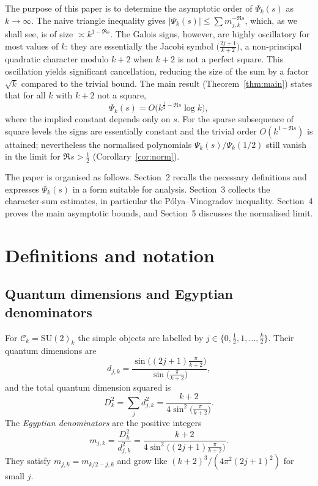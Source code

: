 \documentclass[11pt,a4paper]{article}
\theoremstyle{definition}
\theoremstyle{remark}
\begin{document}
The purpose of this paper is to determine the asymptotic order of $\Psi_k(s)$ as $k\to\infty$.
The naive triangle inequality gives $|\Psi_k(s)|\le \sum m_{j,k}^{-\Re s}$,
which, as we shall see, is of size $\asymp k^{1-\Re s}$.
The Galois signs, however, are highly oscillatory for most values of $k$:
they are essentially the Jacobi symbol $\bigl(\frac{2j+1}{k+2}\bigr)$,
a non‑principal quadratic character modulo $k+2$ when $k+2$ is not a perfect square.
This oscillation yields significant cancellation, reducing the size of the sum
by a factor $\sqrt{k}$ compared to the trivial bound.
The main result (Theorem~\ref{thm:main}) states that for all $k$ with $k+2$ not a square,
\[
\Psi_k(s)=O\bigl(k^{\frac12-\Re s}\log k\bigr),
\]
where the implied constant depends only on $s$.
For the sparse subsequence of square levels the signs are essentially constant and
the trivial order $O(k^{1-\Re s})$ is attained; nevertheless the normalised
polynomials $\Psi_k(s)/\Psi_k(1/2)$ still vanish in the limit for $\Re s>\frac12$
(Corollary~\ref{cor:norm}).

The paper is organised as follows.  Section~2 recalls the necessary definitions
and expresses $\Psi_k(s)$ in a form suitable for analysis.
Section~3 collects the character‑sum estimates, in particular the
P\'olya--Vinogradov inequality.  Section~4 proves the main asymptotic bounds,
and Section~5 discusses the normalised limit.

\section{Definitions and notation}

\subsection{Quantum dimensions and Egyptian denominators}
For $\mathcal{C}_k=\mathrm{SU}(2)_k$ the simple objects are labelled by
$j\in\{0,\tfrac12,1,\dots,\tfrac{k}{2}\}$.
Their quantum dimensions are
\begin{equation}\label{eq:qdim}
d_{j,k}= \frac{\sin\bigl((2j+1)\frac{\pi}{k+2}\bigr)}
                {\sin\bigl(\frac{\pi}{k+2}\bigr)},
\end{equation}
and the total quantum dimension squared is
\begin{equation}\label{eq:D2}
D_k^2=\sum_j d_{j,k}^2
     =\frac{k+2}{4\sin^2\!\bigl(\frac{\pi}{k+2}\bigr)}.
\end{equation}
The \emph{Egyptian denominators} are the positive integers
\begin{equation}\label{eq:m}
m_{j,k}= \frac{D_k^2}{d_{j,k}^2}
        =\frac{k+2}{4\sin^2\!\bigl((2j+1)\frac{\pi}{k+2}\bigr)}.
\end{equation}
They satisfy $m_{j,k}=m_{k/2-j,k}$ and grow like $(k+2)^3/(4\pi^2(2j+1)^2)$ for small $j$.
\end{document}
